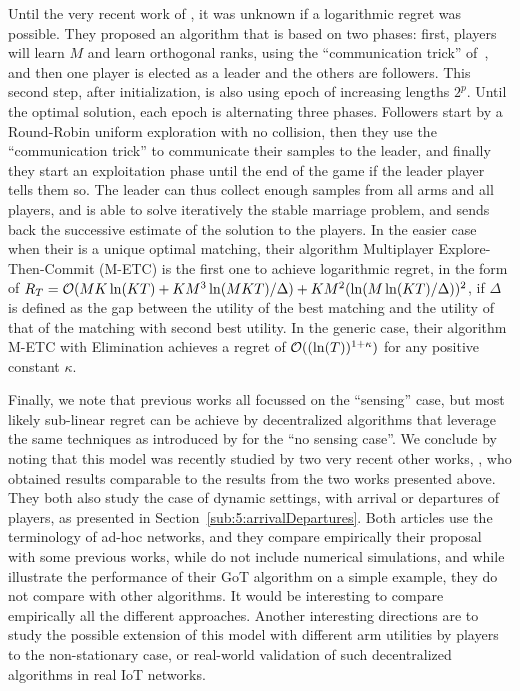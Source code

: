 Until the very recent work of \cite{KaufmannAbbas19}, it was unknown if a logarithmic regret was possible.
They proposed an algorithm that is based on two phases: first, players will learn $M$ and learn orthogonal ranks, using the ``communication trick'' of~\cite{BoursierPerchet18}, and then one player is elected as a leader and the others are followers.
This second step, after initialization, is also using epoch of increasing lengths $2^p$.
Until the optimal solution, each epoch is alternating three phases.
Followers start by a Round-Robin uniform exploration with no collision, then they use the ``communication trick'' to communicate their samples to the leader, and finally they start an exploitation phase until the end of the game if the leader player tells them so.
The leader can thus collect enough samples from all arms and all players, and is able to solve iteratively the stable marriage problem, and sends back the successive estimate of the solution to the players.
%
In the easier case when their is a unique optimal matching, their algorithm Multiplayer Explore-Then-Commit (M-ETC) is the first one to achieve logarithmic regret, in the form of $R_T = \mathcal{O}(M K \ln(K T) + K M^3 \ln(M K T) / \Delta) + K M^2 (\ln(M \ln(K T) / \Delta))^2$, if $\Delta$ is defined as the gap between the utility of the best matching and the utility of that of the matching with second best utility.
In the generic case, their algorithm M-ETC with Elimination achieves a regret of $\mathcal{O}((\ln(T))^{1+\kappa})$ for any positive constant $\kappa$.


Finally, we note that previous works all focussed on the ``sensing'' case, but most likely sub-linear regret can be achieve by decentralized algorithms that leverage the same techniques as introduced by \cite{BoursierPerchet18,LugosiMehrabian18} for the ``no sensing case''.
%
We conclude by noting that this model was recently studied by two very recent other works, \cite{DarakHanawal18,Tibrewal2019}, who obtained results comparable to the results from the two works presented above.
They both also study the case of dynamic settings, with arrival or departures of players, as presented in Section~\ref{sub:5:arrivalDepartures}.
Both articles \cite{DarakHanawal18,Tibrewal2019} use the terminology of ad-hoc networks, and they compare empirically their proposal with some previous works, while \cite{KaufmannAbbas19} do not include numerical simulations, and while \cite{Bistritz18} illustrate the performance of their GoT algorithm on a simple example, they do not compare with other algorithms.
%
It would be interesting to compare empirically all the different approaches.
Another interesting directions are to study the possible extension of this model with different arm utilities by players to the non-stationary case, or real-world validation of such decentralized algorithms in real IoT networks.

